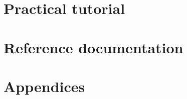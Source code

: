 








\tableofcontents

\mainmatter
{}

\part{Practical tutorial}

%



\part{Reference documentation}













\part{Appendices}




